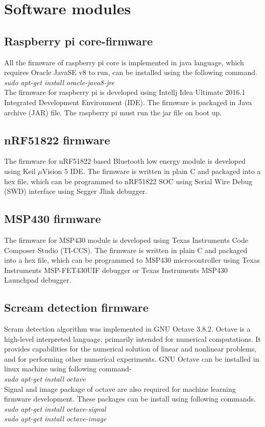\section{Software modules}
\subsection{Raspberry pi core-firmware}
All the firmware of raspberry pi core is implemented in java language, which requires Oracle JavaSE v8 to run, can be installed using the following command.\\
\emph{sudo apt-get install oracle-java8-jre}\\
The firmware for raspberry pi is developed using Intellj Idea Ultimate 2016.1 Integrated Development Environment (IDE). The firmware is packaged in Java archive (JAR) file. The raspberry pi must run the jar file on boot up.
\subsection{nRF51822 firmware}
The firmware for nRF51822 based Bluetooth low energy module is developed using Keil $\mu$Vision 5 IDE. The firmware is written in plain C and packaged into a hex file, which can be programmed to nRF51822 SOC using Serial Wire Debug (SWD) interface using Segger Jlink debugger.
\subsection{MSP430 firmware}
The firmware for MSP430 module is developed using Texas Instruments Code Composer Studio (TI-CCS). The firmware is written in plain C and packaged into a hex file, which can be programmed to MSP430 microcontroller using Texas Instruments MSP-FET430UIF debugger or Texas Instruments MSP430 Launchpad debugger.
\subsection{Scream detection firmware}
Scram detection algorithm was implemented in GNU Octave 3.8.2. Octave is a high-level interpreted language, primarily intended for numerical computations. It provides capabilities for the numerical solution of linear and nonlinear problems, and for performing other numerical experiments. GNU Octave can be installed in linux machine using following command-\\
\emph{sudo apt-get install octave}\\
Signal and image package of octave are also required for machine learning firmware development. These packages can be install using following commands.\\
\emph{sudo apt-get install octave-signal}\\
\emph{sudo apt-get install octave-image}

